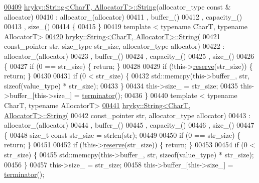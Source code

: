 \begin{DoxyCode}
\hypertarget{string_8h_source_l00409}{}\hyperlink{classhryky_1_1_string_a152a6a4ba727611a34dbeae7538fc0eb}{00409} \hyperlink{classhryky_1_1_string}{hryky::String<CharT, AllocatorT>::String}(allocator\_type \textcolor{keyword}{const} & allocator)
00410     : allocator\_(allocator)
00411       , buffer\_()
00412       , capacity\_()
00413       , size\_()
00414 \{
00415 \}
00419 \textcolor{keyword}{template} < \textcolor{keyword}{typename} CharT, \textcolor{keyword}{typename} AllocatorT>
\hypertarget{string_8h_source_l00420}{}\hyperlink{classhryky_1_1_string_a4b0a859218ad9a38373e75279d0509ed}{00420} \hyperlink{classhryky_1_1_string}{hryky::String<CharT, AllocatorT>::String}(
00421     const\_pointer str, size\_type str\_size, allocator\_type allocator)
00422     : allocator\_(allocator)
00423       , buffer\_()
00424       , capacity\_()
00425       , size\_()
00426 \{
00427     \textcolor{keywordflow}{if} (0 == str\_size) \{ \textcolor{keywordflow}{return}; \}
00428     
00429     \textcolor{keywordflow}{if} (!this->\hyperlink{classhryky_1_1_string_aae6ce7131e8bb4c2cf03689a6a183b8d}{reserve}(str\_size)) \{ \textcolor{keywordflow}{return}; \}
00430 
00431     \textcolor{keywordflow}{if} (0 < str\_size) \{
00432         std::memcpy(this->buffer\_, str, \textcolor{keyword}{sizeof}(value\_type) * str\_size);
00433     \}
00434     this->size\_ = str\_size;
00435     this->buffer\_[this->size\_] = \hyperlink{classhryky_1_1_string_ab1308696e8665314373d9aec581a3095}{terminator}();
00436 \}
00440 \textcolor{keyword}{template} < \textcolor{keyword}{typename} CharT, \textcolor{keyword}{typename} AllocatorT>
\hypertarget{string_8h_source_l00441}{}\hyperlink{classhryky_1_1_string_a6b69d30c7062d8f4fff138f6ad85150d}{00441} \hyperlink{classhryky_1_1_string}{hryky::String<CharT, AllocatorT>::String}(
00442     const\_pointer str, allocator\_type allocator)
00443     : allocator\_(allocator)
00444       , buffer\_()
00445       , capacity\_()
00446       , size\_()
00447 \{
00448     \textcolor{keywordtype}{size\_t} \textcolor{keyword}{const} str\_size = strlen(str);
00449     
00450     \textcolor{keywordflow}{if} (0 == str\_size) \{ \textcolor{keywordflow}{return}; \}
00451     
00452     \textcolor{keywordflow}{if} (!this->\hyperlink{classhryky_1_1_string_aae6ce7131e8bb4c2cf03689a6a183b8d}{reserve}(str\_size)) \{ \textcolor{keywordflow}{return}; \}
00453 
00454     \textcolor{keywordflow}{if} (0 < str\_size) \{
00455         std::memcpy(this->buffer\_, str, \textcolor{keyword}{sizeof}(value\_type) * str\_size);
00456     \}
00457     this->size\_ = str\_size;
00458     this->buffer\_[this->size\_] = \hyperlink{classhryky_1_1_string_ab1308696e8665314373d9aec581a3095}{terminator}();

\end{DoxyCode}
